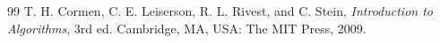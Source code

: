 \begin{thebibliography}{99}
T. H. Cormen, C. E. Leiserson, R. L. Rivest, and C. Stein,
\textit{Introduction to Algorithms}, 3rd ed. Cambridge, MA, USA:
The MIT Press, 2009.
\end{thebibliography}
